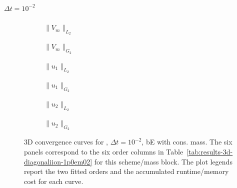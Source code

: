 \subsubsection{}
\paragraph{$\Delta t=10^{-2}$}

\begin{figure}[p]
\centering
\begin{subfigure}{0.485\linewidth}
\centering
{}
\caption{$\|V_m\|_{L_2}$}
\label{fig:results-3d-diagonaliion-1p0em02-backwardeuler-consistent-a}
\end{subfigure}
\hfill
\begin{subfigure}{0.485\linewidth}
\centering
{}
\caption{$\|V_m\|_{G_2}$}
\label{fig:results-3d-diagonaliion-1p0em02-backwardeuler-consistent-b}
\end{subfigure}
\par\vspace{0.8em}
\begin{subfigure}{0.485\linewidth}
\centering
{}
\caption{$\|u_1\|_{L_2}$}
\label{fig:results-3d-diagonaliion-1p0em02-backwardeuler-consistent-c}
\end{subfigure}
\hfill
\begin{subfigure}{0.485\linewidth}
\centering
{}
\caption{$\|u_1\|_{G_2}$}
\label{fig:results-3d-diagonaliion-1p0em02-backwardeuler-consistent-d}
\end{subfigure}
\par\vspace{0.8em}
\begin{subfigure}{0.485\linewidth}
\centering
{}
\caption{$\|u_2\|_{L_2}$}
\label{fig:results-3d-diagonaliion-1p0em02-backwardeuler-consistent-e}
\end{subfigure}
\hfill
\begin{subfigure}{0.485\linewidth}
\centering
{}
\caption{$\|u_2\|_{G_2}$}
\label{fig:results-3d-diagonaliion-1p0em02-backwardeuler-consistent-f}
\end{subfigure}
\caption{3D convergence curves for , $\Delta t=10^{-2}$, bE with cons. mass. The six panels correspond to the six order columns in Table~\ref{tab:results-3d-diagonaliion-1p0em02} for this scheme/mass block. The plot legends report the two fitted orders and the accumulated runtime/memory cost for each curve.}
\label{fig:results-3d-diagonaliion-1p0em02-backwardeuler-consistent}
\end{figure}
\FloatBarrier

